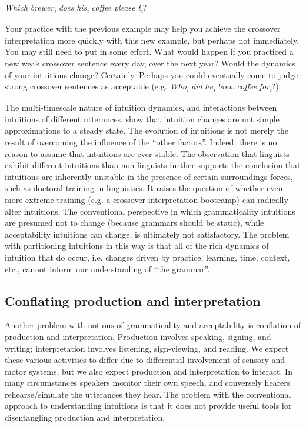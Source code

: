     \textit{Which} \textit{brewer\textsubscript{i}} \textit{does} \textit{his\textsubscript{i}} \textit{coffee} \textit{please} \textit{t\textsubscript{i}}?

  Your practice with the previous example may help you achieve the crossover interpretation more quickly with this new example, but perhaps not immediately. You may still need to put in some effort. What would happen if you practiced a new weak crossover sentence every day, over the next year? Would the dynamics of your intuitions change? Certainly. Perhaps you could eventually come to judge strong crossover sentences as acceptable (e.g. \textit{Who\textsubscript{i}} \textit{did} \textit{he\textsubscript{i}} \textit{brew} \textit{coffee} \textit{for\textsubscript{i}}?). 

  The multi-timescale nature of intuition dynamics, and interactions between intuitions of different utterances, show that intuition changes are not simple approximations to a steady state. The evolution of intuitions is not merely the result of overcoming the influence of the “other factors”. Indeed, there is no reason to assume that intuitions are ever stable. The observation that linguists exhibit different intuitions than non-linguists \citep{Spencer1973} further supports the conclusion that intuitions are inherently unstable in the presence of certain surroundings forces, such as doctoral training in linguistics. It raises the question of whether even more extreme training (e.g. a crossover interpretation bootcamp) can radically alter intuitions. The conventional perspective in which grammaticality intuitions are presumed not to change (because grammars should be static), while acceptability intuitions can change, is ultimately not satisfactory. The problem with partitioning intuitions in this way is that all of the rich dynamics of intuition that do occur, i.e. changes driven by practice, learning, time, context, etc., cannot inform our understanding of “the grammar”.

\subsection{Conflating production and interpretation}

Another problem with notions of grammaticality and acceptability is conflation of production and interpretation. Production involves speaking, signing, and writing; interpretation involves listening, sign-viewing, and reading. We expect these various activities to differ due to differential involvement of sensory and motor systems, but we also expect production and interpretation to interact. In many circumstances speakers monitor their own speech, and conversely hearers rehearse/simulate the utterances they hear. The problem with the conventional approach to understanding intuitions is that it does not provide useful tools for disentangling production and interpretation.

